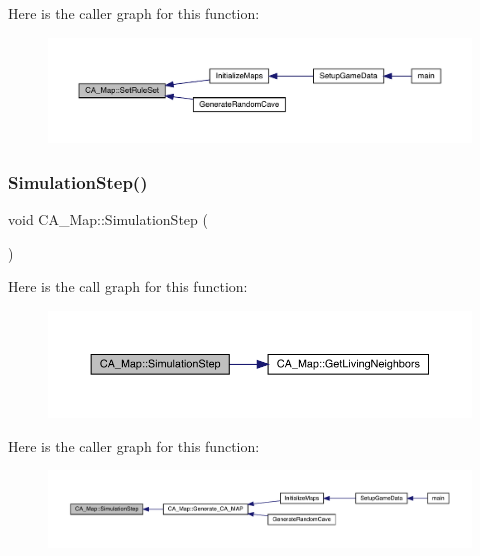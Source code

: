 Here is the caller graph for this function\+:
\nopagebreak
\begin{figure}[H]
\begin{center}
\leavevmode
\includegraphics[width=350pt]{df/dfe/class_c_a___map_a5d22c84ef623d63d99300d1f83af143e_icgraph}
\end{center}
\end{figure}
\mbox{\label{class_c_a___map_a9f978dd06a224ab2acf97f1c532ec3da}} 
\subsubsection{\texorpdfstring{Simulation\+Step()}{SimulationStep()}}
{\footnotesize\ttfamily void C\+A\+\_\+\+Map\+::\+Simulation\+Step (\begin{DoxyParamCaption}{ }\end{DoxyParamCaption})}

Here is the call graph for this function\+:
\nopagebreak
\begin{figure}[H]
\begin{center}
\leavevmode
\includegraphics[width=350pt]{df/dfe/class_c_a___map_a9f978dd06a224ab2acf97f1c532ec3da_cgraph}
\end{center}
\end{figure}
Here is the caller graph for this function\+:
\nopagebreak
\begin{figure}[H]
\begin{center}
\leavevmode
\includegraphics[width=350pt]{df/dfe/class_c_a___map_a9f978dd06a224ab2acf97f1c532ec3da_icgraph}
\end{center}
\end{figure}
\mbox{\label{class_c_a___map_a7a3a75540c418bdcee3689ecfca4cbff}} 
